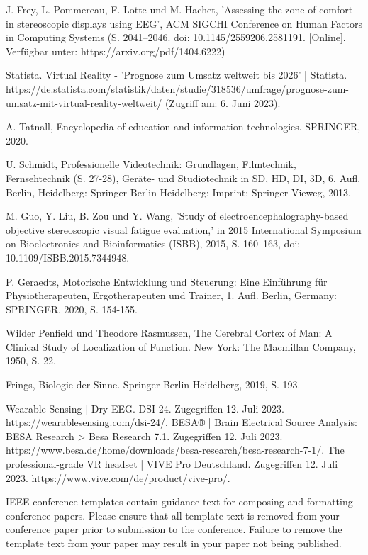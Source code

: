 \documentclass[conference]{IEEEtran}
\begin{document}
\begin{thebibliography}{00}
 J. Frey, L. Pommereau, F. Lotte und M. Hachet, 'Assessing the zone of comfort in stereoscopic displays using EEG', ACM SIGCHI Conference on Human Factors in Computing Systems (S. 2041–2046. doi: 10.1145/2559206.2581191. [Online]. Verfügbar unter: https://arxiv.org/pdf/1404.6222)

 Statista. Virtual Reality - 'Prognose zum Umsatz weltweit bis 2026' | Statista. https://de.statista.com/statistik/daten/studie/318536/umfrage/prognose-zum-umsatz-mit-virtual-reality-weltweit/ (Zugriff am: 6. Juni 2023).

 A. Tatnall, Encyclopedia of education and information technologies. SPRINGER, 2020.

 U. Schmidt, Professionelle Videotechnik: Grundlagen, Filmtechnik, Fernsehtechnik (S. 27-28), Geräte- und Studiotechnik in SD, HD, DI, 3D, 6. Aufl. Berlin, Heidelberg: Springer Berlin Heidelberg; Imprint: Springer Vieweg, 2013.

 M. Guo, Y. Liu, B. Zou und Y. Wang, 'Study of electroencephalography-based objective stereoscopic visual fatigue evaluation,' in 2015 International Symposium on Bioelectronics and Bioinformatics (ISBB), 2015, S. 160–163, doi: 10.1109/ISBB.2015.7344948.

 P. Geraedts, Motorische Entwicklung und Steuerung: Eine Einführung für Physiotherapeuten, Ergotherapeuten und Trainer, 1. Aufl. Berlin, Germany: SPRINGER, 2020, S. 154-155.

 Wilder Penfield und Theodore Rasmussen, The Cerebral Cortex of Man: A Clinical Study of Localization of Function. New York: The Macmillan Company, 1950, S. 22.

 Frings, Biologie der Sinne. Springer Berlin Heidelberg, 2019, S. 193.

Wearable Sensing | Dry EEG. DSI-24. Zugegriffen 12. Juli 2023. https://wearablesensing.com/dsi-24/.
BESA® | Brain Electrical Source Analysis: BESA Research > Besa Research 7.1. Zugegriffen 12. Juli 2023. https://www.besa.de/home/downloads/besa-research/besa-research-7-1/.
The professional-grade VR headset | VIVE Pro Deutschland. Zugegriffen 12. Juli 2023. https://www.vive.com/de/product/vive-pro/.


\end{thebibliography}
\vspace{12pt}
\color{red}
IEEE conference templates contain guidance text for composing and formatting conference papers. Please ensure that all template text is removed from your conference paper prior to submission to the conference. Failure to remove the template text from your paper may result in your paper not being published.
\end{document}
